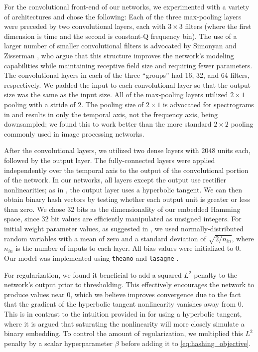 For the convolutional front-end of our networks, we experimented with a variety of architectures and chose the following:
Each of the three max-pooling layers were preceded by two convolutional layers, each with $3 \times 3$ filters (where the first dimension is time and the second is constant-Q frequency bin).
The use of a larger number of smaller convolutional filters is advocated by Simonyan and Zisserman \cite{simonyan2014very}, who argue that this structure improves the network's modeling capabilities while maintaining receptive field size and requiring fewer parameters.
The convolutional layers in each of the three ``groups'' had 16, 32, and 64 filters, respectively.
We padded the input to each convolutional layer so that the output size was the same as the input size.
All of the max-pooling layers utilized $2 \times 1$ pooling with a stride of $2$.
The pooling size of $2 \times 1$ is advocated for spectrograms in \cite{humphrey2012rethinking} and results in only the temporal axis, not the frequency axis, being downsampled; we found this to work better than the more standard $2 \times 2$ pooling commonly used in image processing networks.

After the convolutional layers, we utilized two dense layers with $2048$ units each, followed by the output layer.
The fully-connected layers were applied independently over the temporal axis to the output of the convolutional portion of the network.
In our networks, all layers except the output use rectifier nonlinearities; as in \cite{masci2014multimodal}, the output layer uses a hyperbolic tangent.
We can then obtain binary hash vectors by testing whether each output unit is greater or less than zero.
We chose 32 bits as the dimensionality of our embedded Hamming space, since 32 bit values are efficiently manipulated as unsigned integers.
For initial weight parameter values, as suggested in \cite{he2015delving}, we used normally-distributed random variables with a mean of zero and a standard deviation of $\sqrt{2/n_{in}}$, where $n_{in}$ is the number of inputs to each layer.
All bias values were initialized to $0$.
Our model was implemented using \texttt{theano} \cite{bergstra2010theano,bastien2012theano,al-rfou2016theano} and \texttt{lasagne} \cite{dieleman2015lasagne}.

For regularization, we found it beneficial to add a squared $L^2$ penalty to the network's output prior to thresholding.
This effectively encourages the network to produce values near 0, which we believe improves convergence due to the fact that the gradient of the hyperbolic tangent nonlinearity vanishes away from 0.
This is in contrast to the intuition provided in \cite{masci2014multimodal} for using a hyperbolic tangent, where it is argued that saturating the nonlinearity will more closely simulate a binary embedding.
To control the amount of regularization, we multiplied this $L^2$ penalty by a scalar hyperparameter $\beta$ before adding it to \cref{eq:hashing_objective}.

